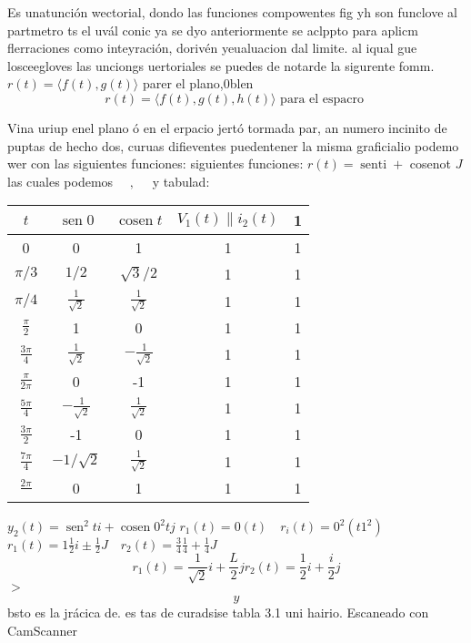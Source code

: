 

Es unatunción wectorial, dondo las funciones compowentes fig yh son funclove al partmetro ts el uvál conic ya se dyo anteriormente se aclppto para aplicm flerraciones como inteyración, dorivén yeualuacion dal limite. al iqual gue losceegloves las unciongs uertoriales se puedes de notarde la sigurente fomm.
$r(t)=\langle f(t), g(t)\rangle$ parer el plano,0blen
$$
r(t)=\langle f(t), g(t), h(t)\rangle \text { para el espacro }
$$

Vina uriup enel plano ó en el erpacio jertó tormada par, an numero incinito de puptas de hecho dos, curuas difieventes puedentener la misma graficialio podemo wer con las siguientes funciones:
siguientes funciones: $r(t)=\operatorname{senti}+$ cosenot $J$
las cuales podemos $\quad, \quad$ y
tabulad:
\begin{tabular}{|c|c|c|c|c|}
	\hline$t$ & $\operatorname{sen} 0$ & $\operatorname{cosen} t$ & $V_1(t) \| i_2(t)$ & 1 \\
	\hline 0 & 0 & 1 & 1 & 1 \\
	\hline$\pi / 3$ & $1 / 2$ & $\sqrt{3} / 2$ & 1 & 1 \\
	\hline$\pi / 4$ & $\frac{1}{\sqrt{2}}$ & $\frac{1}{\sqrt{2}}$ & 1 & 1 \\
	\hline$\frac{\pi}{2}$ & 1 & 0 & 1 & 1 \\
	\hline$\frac{3 \pi}{4}$ & $\frac{1}{\sqrt{2}}$ & $-\frac{1}{\sqrt{2}}$ & 1 & 1 \\
	\hline$\frac{\pi}{2 \pi}$ & 0 & -1 & 1 & 1 \\
	\hline$\frac{5 \pi}{4}$ & $-\frac{1}{\sqrt{2}}$ & $\frac{1}{\sqrt{2}}$ & 1 & 1 \\
	\hline$\frac{3 \pi}{2}$ & -1 & 0 & 1 & 1 \\
	\hline$\frac{7 \pi}{4}$ & $-1 / \sqrt{2}$ & $\frac{1}{\sqrt{2}}$ & 1 & 1 \\
	\hline$\frac{2 \pi}{}$ & 0 & 1 & 1 & 1 \\
	\hline
\end{tabular}
$y_2(t)=\operatorname{sen}^2 t i+\operatorname{cosen} 0^2 t j$ $r_1(t)=0(t) \quad r_i(t)=0^2\left(t 1^2\right)$ $r_1(t)=1 \frac{1}{2} i \pm \frac{1}{2} J \quad r_2(t)=\frac{3}{4} \frac{1}{4}+\frac{1}{4} J$
$$
r_1(t)=\frac{1}{\sqrt{2}} i+\frac{L}{2} j r_2(t)=\frac{1}{2} i+\frac{i}{2} j
$$
$>$
$$
\hat{y}
$$
bsto es la jrácica de. es tas de curadsise
tabla 3.1 uni hairio.
Escaneado con CamScanner




